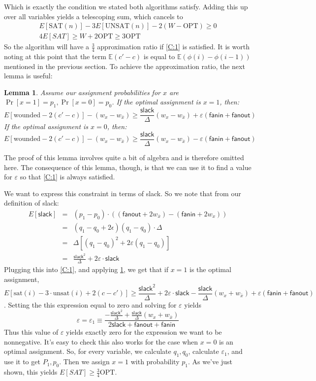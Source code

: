 \documentclass[11pt,letter]{article}
\newtheorem{lemma}[theorem]{Lemma}
\numberwithin{theorem}{section}
\begin{document}
Which is exactly the condition we stated both algorithms satisfy. Adding this up over all variables yields a telescoping sum, which cancels to
\begin{eqnarray}
E[\textrm{SAT}(n)] - 3E[\textrm{UNSAT}(n)] - 2(W-\textrm{OPT}) \ge 0
\\4E[SAT] \ge W + 2\textrm{OPT} \ge 3\textrm{OPT}
\end{eqnarray}
So the algorithm will have a $\frac{3}{4}$ approximation ratio if \ref{C:1} is satisfied. It is worth noting at this point that the term $\mathbb{E}(c'-c)$ is equal to 
$\mathbb{E}(\phi(i) - \phi(i-1))$ mentioned in the previous section. To achieve the approximation ratio, the next lemma is useful:
\begin{lemma} \label{L:3}
Assume our assignment probabilities for $x$ are $\Pr[x = 1] = p_1, \Pr[x=0] = p_0$. If the optimal assignment is $x=1$, then:
\[E[\textrm{wounded} - 2(c'-c)] - (w_x - w_{\bar{x}}) \ge \frac{\mathsf{slack}}{\Delta}(w_x - w_{\bar{x}}) + \varepsilon(\mathsf{fanin} + \mathsf{fanout})\]
If the optimal assignment is  $x=0$, then:
\[E[\textrm{wounded} - 2(c'-c)] - (w_x - w_{\bar{x}}) \ge \frac{\mathsf{slack}}{\Delta}(w_x - w_{\bar{x}}) - \varepsilon(\mathsf{fanin} + \mathsf{fanout})\]
\end{lemma}
The proof of this lemma involves quite a bit of algebra and is therefore omitted here. The consequence of this lemma, though, is that we can use it to find a value for $\varepsilon$ so that  \ref{C:1} is always satisfied.

We want to express this constraint in terms of slack. So we note that from our definition of slack:
\begin{eqnarray}
E[\mathsf{slack}] &=& (p_1-p_0)\cdot ((\mathsf{fanout} + 2w_{\bar{x}}) -(\mathsf{fanin} + 2w_x))
\\&=& (q_1-q_0+2\epsilon)(q_1-q_0)\cdot\Delta
\\&=& \Delta[(q_1-q_0)^2 + 2\varepsilon(q_1-q_0)]
\\&=& \frac{\mathsf{slack}^2}{\Delta} +2\varepsilon\cdot\mathsf{slack}
\end{eqnarray}
Plugging this into \ref{C:1}, and applying \ref{L:3}, we get that if $x=1$ is the optimal assignment,
\[E[\textrm{sat}(i) - 3\cdot\textrm{unsat}(i)+ 2(c-c')] \ge \frac{\mathsf{slack}^2}{\Delta} +2\varepsilon\cdot\mathsf{slack} - \frac{\mathsf{slack}}{\Delta}(w_x + w_{\bar{x}}) + \varepsilon(\mathsf{fanin} + \mathsf{fanout})\].
Setting the this expression equal to zero and solving for $\varepsilon$ yields
\begin{equation}
\varepsilon = \varepsilon_1 \equiv \frac{-\frac{\mathsf{slack}^2}{\Delta} + \frac{\mathsf{slack}}{\Delta}(w_x + w_{\bar{x}})}{2\mathsf{slack}+ \mathsf{fanout} + \mathsf{fanin}}
\end{equation}
Thus this value of $\varepsilon$ yields exactly zero for the expression we want to be nonnegative. It's easy to check this also works for the case when $x=0$ is an optimal assignment. So, for every variable, we calculate $q_1, q_0$, calculate $\varepsilon_1$, and use it to get $P_1, p_0$. Then we assign $x=1$ with probability $p_1$. As we've just shown, this yields $E[SAT] \ge \frac{3}{4}\textrm{OPT}$.
\end{document}
